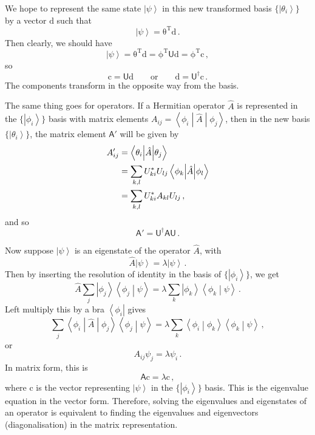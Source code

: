 \documentclass{article}
\theoremstyle{plain}\theoremheaderfont{\normalfont\itshape}\theorembodyfont{\rmfamily}\theoremseparator{.}\newtheorem*{rem}{Remark}\newtheorem*{ex}{Example}\newtheorem*{proof}{Proof}\newtheorem*{altp}{Alternative proof}
\theoremstyle{plain}\theoremheaderfont{\normalfont\bfseries}\theorembodyfont{\rmfamily}\theoremseparator{.}\newtheorem{thm}{Theorem}[section]\newtheorem{lem}[thm]{Lemma}\newtheorem{prop}[thm]{Proposition}\newtheorem*{cor}{Corollary}\newtheorem{defn}[thm]{Definition}\newtheorem{clm}[thm]{Claim}\newtheorem{clminproof}{Claim}
\theoremstyle{break}\theoremheaderfont{\normalfont\itshape}\theorembodyfont{\rmfamily}\theoremseparator{.\medskip}\newtheorem*{proofskip}{Proof}\newtheorem*{exs}{Examples}\newtheorem*{rems}{Remarks}
\theoremstyle{break}\theoremheaderfont{\normalfont\bfseries}\theorembodyfont{\rmfamily}\theoremseparator{.\medskip}\newtheorem{lemskip}[thm]{Lemma}\newtheorem{defnskip}[thm]{Definition}\newtheorem{propskip}[thm]{Proposition}\newtheorem{thmskip}[thm]{Theorem}
\numberwithin{equation}{section}
\newcommand{\tp}{^\mathrm{T}}
\newcommand{\bra}[1]{\left\langle #1 \right|}
\newcommand{\ket}[1]{\left| #1 \right\rangle}
\newcommand{\braket}[2]{\left\langle #1 \middle| #2 \right\rangle}
\newcommand{\mel}[3]{\left\langle #1 \middle| #2 \middle| #3 \right\rangle}
\newcommand{\vb}[1]{\bm{\mathrm{#1}}}
\begin{document}
    We hope to represent the same state \(\ket{\psi}\) in this new transformed basis \(\{\ket{\theta_i}\}\) by a vector \(\vb{d}\) such that
    \begin{equation}
        \ket{\psi}=\vb{\theta}\tp\vb{d}\,.
    \end{equation}
    Then clearly, we should have
    \begin{equation}
        \ket{\psi}=\vb{\theta}\tp\vb{d}=\vb{\phi}\tp\mathsf{U}\vb{d}=\vb{\phi}\tp\vb{c}\,,
    \end{equation}
    so
    \begin{equation}\label{component_transformation}
        \vb{c}=\mathsf{U}\vb{d}\qquad\text{or}\qquad\vb{d}=\mathsf{U}^\dagger\vb{c}\,.
    \end{equation}
    The components transform in the opposite way from the basis.

    The same thing goes for operators. If a Hermitian operator \(\hat{A}\) is represented in the \(\{\ket{\phi_i}\}\) basis with matrix elements \(A_{ij}=\mel{\phi_i}{\hat{A}}{\phi_j}\), then in the new basis \(\{\ket{\theta_i}\}\), the matrix element \(\mathsf{A}'\) will be given by
    \begin{align}
        A_{ij}'&=\mel{\theta_i}{\hat{A}}{\theta_j}\notag\\
        &=\sum_{k,l}U_{ki}^*U_{lj}\mel{\phi_k}{\hat{A}}{\phi_l}\notag\\
        &=\sum_{k,l}U_{ki}^*A_{kl}U_{lj}\,,
    \end{align}
    and so
    \begin{equation}
        \mathsf{A}'=\mathsf{U}^\dagger\mathsf{A}\mathsf{U}\,.
    \end{equation}
    
    Now suppose \(\ket{\psi}\) is an eigenstate of the operator \(\hat{A}\), with
    \begin{equation}
        \hat{A}\ket{\psi}=\lambda\ket{\psi}\,.
    \end{equation}
    Then by inserting the resolution of identity in the basis of \(\{\ket{\phi_i}\}\), we get
    \begin{equation}
        \hat{A}\sum_j\ket{\phi_j}\braket{\phi_j}{\psi}=\lambda\sum_k \ket{\phi_k}\braket{\phi_k}{\psi}\,.
    \end{equation}
    Left multiply this by a bra \(\bra{\phi_i}\) gives
    \begin{equation}
        \sum_j \mel{\phi_i}{\hat{A}}{\phi_j}\braket{\phi_j}{\psi}=\lambda \sum_k \braket{\phi_i}{\phi_k}\braket{\phi_k}{\psi}\,, 
    \end{equation}
    or
    \begin{equation}
        A_{ij}\psi_j = \lambda\psi_i\,.
    \end{equation}
    In matrix form, this is
    \begin{equation}
        \mathsf{A}\vb{c}=\lambda\vb{c}\,,
    \end{equation}
    where \(\vb{c}\) is the vector representing \(\ket{\psi}\) in the \(\{\ket{\phi_i}\}\) basis. This is the eigenvalue equation in the vector form. Therefore, solving the eigenvalues and eigenstates of an operator is equivalent to finding the eigenvalues and eigenvectors (diagonalisation) in the matrix representation.
\end{document}
